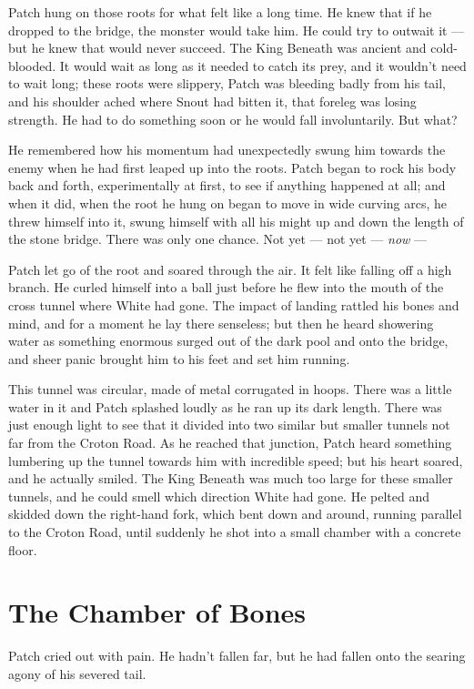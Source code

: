 \documentclass[12pt]{memoir}
\begin{document}
Patch hung on those roots for what felt like a long time. He knew that
if he dropped to the bridge, the monster would take him. He could try
to outwait it — but he knew that would never succeed. The King Beneath
was ancient and cold-blooded. It would wait as long as it needed to
catch its prey, and it wouldn’t need to wait long; these roots were
slippery, Patch was bleeding badly from his tail, and his shoulder
ached where Snout had bitten it, that foreleg was losing strength. He
had to do something soon or he would fall involuntarily. But what?

He remembered how his momentum had unexpectedly swung him towards the
enemy when he had first leaped up into the roots. Patch began to rock
his body back and forth, experimentally at first, to see if anything
happened at all; and when it did, when the root he hung on began to
move in wide curving arcs, he threw himself into it, swung himself
with all his might up and down the length of the stone bridge. There
was only one chance. Not yet — not yet — \textit{now} —

Patch let go of the root and soared through the air. It felt like
falling off a high branch. He curled himself into a ball just before
he flew into the mouth of the cross tunnel where White had gone. The
impact of landing rattled his bones and mind, and for a moment he lay
there senseless; but then he heard showering water as something
enormous surged out of the dark pool and onto the bridge, and sheer
panic brought him to his feet and set him running.

This tunnel was circular, made of metal corrugated in hoops. There was
a little water in it and Patch splashed loudly as he ran up its dark
length. There was just enough light to see that it divided into two
similar but smaller tunnels not far from the Croton Road. As he
reached that junction, Patch heard something lumbering up the tunnel
towards him with incredible speed; but his heart soared, and he
actually smiled. The King Beneath was much too large for these smaller
tunnels, and he could smell which direction White had gone. He pelted
and skidded down the right-hand fork, which bent down and around,
running parallel to the Croton Road, until suddenly he shot into a
small chamber with a concrete floor.


\section{The Chamber of Bones}

Patch cried out with pain. He hadn’t fallen far, but he had fallen
onto the searing agony of his severed tail.
\end{document}
